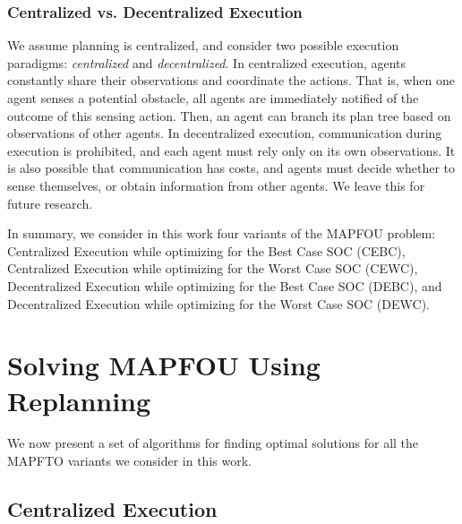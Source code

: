 \documentclass[letterpaper]{article} %
\begin{document}
\subsubsection*{Centralized vs. Decentralized Execution}
We assume planning is centralized, and consider two possible execution paradigms: \emph{centralized} and \emph{decentralized}. In centralized execution, agents constantly share their observations and coordinate the actions. That is, when one agent senses a potential obstacle, all agents are immediately notified of the outcome of this sensing action. Then, an agent can branch its plan tree based on observations of other agents.
In decentralized execution, communication during execution is prohibited, and each agent must rely only on its own observations. 
It is also possible that communication has costs, and agents must decide whether to sense themselves, or obtain information from other agents. We leave this for future research.




In summary, we consider in this work four variants of the MAPFOU problem: 
Centralized Execution while optimizing for the Best Case SOC (CEBC),  
Centralized Execution while optimizing for the Worst Case SOC (CEWC),  
Decentralized Execution while optimizing for the Best Case SOC (DEBC), and
Decentralized Execution while optimizing for the Worst Case SOC (DEWC).  

\section{Solving MAPFOU Using Replanning}

We now present a set of algorithms for finding optimal solutions for all the MAPFTO variants we consider in this work. 




\subsection{Centralized Execution}

\end{document}
